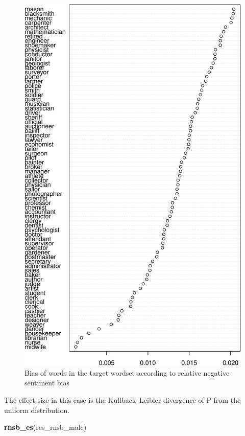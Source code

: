 \documentclass[english,man,mask]{apa6}
\newenvironment{Shaded}{\begin{snugshade}}{\end{snugshade}}
\newcommand{\KeywordTok}[1]{\textcolor[rgb]{0.13,0.29,0.53}{\textbf{#1}}}
\newcommand{\NormalTok}[1]{#1}
\begin{document}
\begin{figure}
\centering
\includegraphics{ica_files/figure-latex/rnsb-1.pdf}
\caption{\label{fig:rnsb}Bias of words in the target wordset according to relative negative sentiment bias}
\end{figure}

The effect size in this case is the Kullback--Leibler divergence of P from the uniform distribution.

\begin{Shaded}
\begin{Highlighting}[]
\KeywordTok{rnsb_es}\NormalTok{(res_rnsb_male)}
\end{Highlighting}
\end{Shaded}
\end{document}
